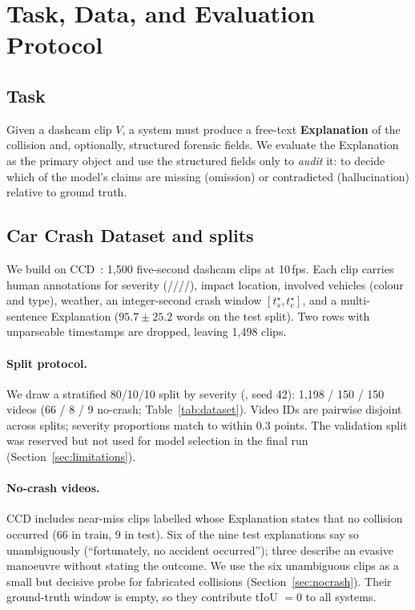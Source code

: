 \section{Task, Data, and Evaluation Protocol}
\label{sec:dataset}

\subsection{Task}
Given a dashcam clip $V$, a system must produce a free-text \textbf{Explanation} of the collision and, optionally, structured forensic fields.
We evaluate the Explanation as the primary object and use the structured fields only to \emph{audit} it: to decide which of the model's claims are missing (omission) or contradicted (hallucination) relative to ground truth.

\subsection{Car Crash Dataset and splits}
We build on CCD~\cite{bao2020nondeterministic}: 1{,}500 five-second dashcam clips at 10\,fps.
Each clip carries human annotations for severity (////), impact location, involved vehicles (colour and type), weather, an integer-second crash window $[t_s^\star,t_e^\star]$, and a multi-sentence Explanation ($95.7\pm25.2$ words on the test split).
Two rows with unparseable timestamps are dropped, leaving 1{,}498 clips.

\paragraph{Split protocol.}
We draw a stratified 80/10/10 split by severity (, seed 42): 1{,}198 / 150 / 150 videos (66 / 8 / 9 no-crash; Table~\ref{tab:dataset}).
Video IDs are pairwise disjoint across splits; severity proportions match to within $0.3$ points.
The validation split was reserved but not used for model selection in the final run (Section~\ref{sec:limitations}).

\paragraph{No-crash videos.}
CCD includes near-miss clips labelled  whose Explanation states that no collision occurred (66 in train, 9 in test).
Six of the nine test  explanations say so unambiguously (``fortunately, no accident occurred''); three describe an evasive manoeuvre without stating the outcome.
We use the six unambiguous clips as a small but decisive probe for fabricated collisions (Section~\ref{sec:nocrash}).
Their ground-truth window is empty, so they contribute tIoU $=0$ to all systems.

